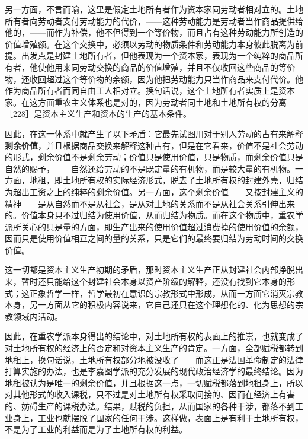 另一方面，不言而喻，这里是假定土地所有者作为资本家同劳动者相对立的。土地所有者向劳动者支付劳动能力的代价，——这种劳动能力是劳动者当作商品提供给他的，——而作为补偿，他不但得到一个等价物，而且占有这种劳动能力所创造的价值增殖额。在这个交换中，必须以劳动的物质条件和劳动能力本身彼此脱离为前提。出发点是封建土地所有者，但他表现为一个资本家，表现为一个纯粹的商品所有者，他使他用来同劳动交换的商品的价值增殖，并且不仅收回这些商品的等价物，还收回超过这个等价物的余额，因为他把劳动能力只当作商品来支付代价。他作为商品所有者而同自由工人相对立。换句话说，这个土地所有者实质上是资本家。在这方面重农主义体系也是对的，因为劳动者同土地和土地所有权的分离［228］是资本主义生产和资本的生产的基本条件。

因此，在这一体系中就产生了以下矛盾：它最先试图用对于别人劳动的占有来解释\textbf{剩余价值}，并且根据商品交换来解释这种占有，但是在它看来，价值不是社会劳动的形式，剩余价值不是剩余劳动；价值只是使用价值，只是物质，而剩余价值只是自然的赐予，——自然还给劳动的不是既定量的有机物，而是较大量的有机物。一方面，地租，即土地所有权的实际经济形式，脱去了土地所有权的封建外壳，归结为超出工资之上的纯粹的剩余价值。另一方面，这个剩余价值——又按封建主义的精神——是从自然而不是从社会，是从对土地的关系而不是从社会关系引伸出来的。价值本身只不过归结为使用价值，从而归结为物质。而在这个物质中，重农学派所关心的只是量的方面，即生产出来的使用价值超过消费掉的使用价值的余额，因而只是使用价值相互之间的量的关系，只是它们的最终要归结为劳动时间的交换价值。

这一切都是资本主义生产初期的矛盾，那时资本主义生产正从封建社会内部挣脱出来，暂时还只能给这个封建社会本身以资产阶级的解释，还没有找到它本身的形式；这正象哲学一样，哲学最初在意识的宗教形式中形成，从而一方面它消灭宗教本身，另一方面从它的积极内容说来，它自己还只在这个理想化的、化为思想的宗教领域内活动。

因此，在重农学派本身得出的结论中，对土地所有权的表面上的推崇，也就变成了对土地所有权的经济上的否定和对资本主义生产的肯定。一方面，全部赋税都转到地租上，换句话说，土地所有权部分地被没收了——而这正是法国革命制定的法律打算实施的办法，也是李嘉图学派的充分发展的现代政治经济学的最终结论。因为地租被认为是唯一的剩余价值，并且根据这一点，一切赋税都落到地租身上，所以对其他形式的收入课税，只不过是对土地所有权采取间接的、因而在经济上有害的、妨碍生产的课税办法。结果，赋税的负担，从而国家的各种干涉，都落不到工业身上，工业也就摆脱了国家的任何干涉。这样做，表面上是有利于土地所有权，不是为了工业的利益而是为了土地所有权的利益。

